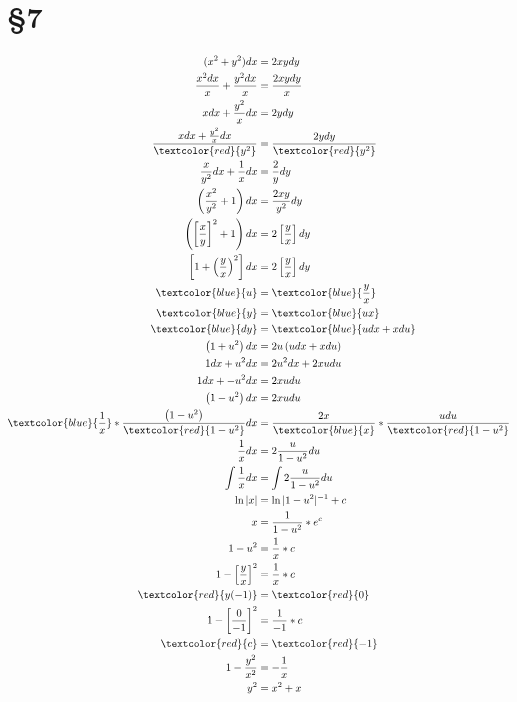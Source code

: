 \section*{\S 7}
\begin{ex}
\begin{align*}
    (x^2+y^2)dx &= 2xydy\\
    \frac{x^2 dx}{x}+\frac{y^2 dx}{x}&=\frac{2xy dy}{x}\\
    xdx+\frac{y^2}{x}dx&=2ydy\\
    \frac{xdx+\frac{y^2}{x}dx}{\textcolor{red}{y^2}}&=\frac{2ydy}{\textcolor{red}{y^2}}\\
    \frac{x}{y^2} dx+ \frac{1}{x}dx &= \frac{2}{y}dy\\
    \left( \frac{x^2}{y^2} +1 \right) dx &= \frac{2xy}{y^2}dy\\
    \left( \left[ \frac{x}{y} \right]^2 +1 \right) dx &= 2 \left[ \frac{y}{x} \right] dy\\
    \left[  1+ \left( \frac{y}{x}\right) ^2  \right] dx &= 2 \left[ \frac{y}{x} \right] dy\\
    \textcolor{blue}{u} &= \textcolor{blue}{\frac{y}{x}}\\
    \textcolor{blue}{y} &= \textcolor{blue}{ux}\\
    \textcolor{blue}{dy} &= \textcolor{blue}{udx+xdu}\\
    \left( 1+u^2 \right)dx &= 2u \left( udx+xdu \right)\\
    1dx+u^2dx &= 2u^2dx+2xudu\\
    1dx+-u^2dx &= 2xudu\\
    \left( 1-u^2 \right) dx &= 2x u du\\
    \textcolor{blue}{\frac{1}{x}} * \frac{\left( 1-u^2 \right) }{\textcolor{red}{1-u^2}} dx &= \frac{2x}{\textcolor{blue}{x}} * \frac{u du}{\textcolor{red}{1-u^2}}\\
    \frac{1}{x}dx &= 2\frac{u}{1-u^2}du\\
    \int \frac{1}{x}dx &= \int 2\frac{u}{1-u^2}du\\
    \ln |x| &= \ln |1-u^2|^{-1}+c\\
    x &= \frac{1}{1-u^2}*e^c\\
    1-u^2 &= \frac{1}{x} *c\\
    1-\left[ \frac{y}{x} \right] ^2 &= \frac{1}{x}*c\\
    \textcolor{red}{y(-1)} &= \textcolor{red}{0}\\
    1-\left[ \frac{0}{-1} \right]^2 &= \frac{1}{-1}*c\\
    \textcolor{red}{c} &= \textcolor{red}{-1}\\
    1-\frac{y^2}{x^2} &= - \frac{1}{x}\\
    y^2 &= x^2+x\\
\end{align*}
\end{ex}
